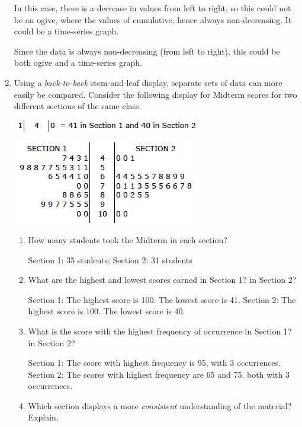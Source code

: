 \documentclass{article}
\newcommand{\answer}[1]{\color{white}#1}
\begin{document}
\begin{enumerate}
	{\answer{\parbox[t]{2.0in}{In this case, there is a decrease in values from left to right, so this could not be an ogive, where the values of cumulative, hence always non-decreasing.  It could be a time-series graph.}
	\hspace{4cm} \parbox[t]{2.0in}{Since the data is always non-decreasing (from left to right), this could be both ogive and a time-series graph.}}} 


\item Using a {\em back-to-back} stem-and-leaf display, separate sets of data can more easily be compared.  Consider the following display for Midterm scores for two different sections of the same class.

\begin{center}
	\includegraphics[scale=0.5]{WS2_StemLabel.jpg}
	
	\includegraphics[scale=0.5]{WS2_Stem.jpg} 
\end{center}	

	\begin{enumerate}
	\item How many students took the Midterm in each section?
	
	{\answer{Section 1: 35 students; Section 2: 31 students}} 
	
	\item What are the highest and lowest scores earned in Section 1?  in Section 2?
	
	{\answer{Section 1: The highest score is 100.  The lowest score is 41. 
	Section 2:  The highest score is 100.  The lowest score is 40.}} 
	
	\item What is the score with the highest frequency of occurrence in Section 1?  in Section 2?
	
	{\answer{Section 1: The score with highest frequency is 95, with 3 occurrences. 
	Section 2:  The scores with highest frequency are 65 and 75, both with 3 occurrences.}} 
	
	\item Which section displays a more {\em consistent} understanding of the material?  Explain.
	

\end{enumerate}
\end{enumerate}
\end{document}
